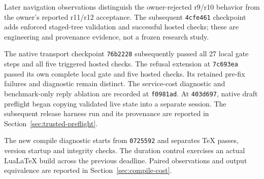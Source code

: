 \documentclass[10pt,a4paper]{article}
\newcommand{\code}[1]{\texttt{#1}}
\begin{document}
Later navigation observations distinguish the owner-rejected r9/r10 behavior
from the owner's reported r11/r12 acceptance. The subsequent \code{4cfe461}
checkpoint adds enforced staged-tree validation and successful hosted checks;
these are engineering and provenance evidence, not a frozen research study.

The native transport checkpoint \code{76b2228} subsequently passed all 27
local gate steps and all five triggered hosted checks. The refusal extension
at \code{7c693ea} passed its own complete local gate and five hosted checks.
Its retained pre-fix failures and diagnostic remain distinct. The
service-cost diagnostic and benchmark-only reply ablation are recorded at
\code{f0981ad}. At \code{403d697}, native draft preflight began copying
validated live state into a separate session. The subsequent release harness
run and its provenance are reported in Section~\ref{sec:trusted-preflight}.

The new compile diagnostic starts from \code{0725592} and separates TeX
passes, version startup and integrity checks. The duration control exercises
an actual Lua\LaTeX{} build across the previous deadline. Paired observations
and output equivalence are reported in Section~\ref{sec:compile-cost}.











\appendix




\begingroup
\footnotesize
\setlength{\parskip}{1pt}


\endgroup
\end{document}
